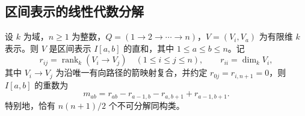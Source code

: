 \subsection{区间表示的线性代数分解}
\label{b5:subsec:0903:03}

\begin{theorem}\label{b5:thm:linear-quiver-intervals}
	设 \(k\) 为域，\(n\ge1\) 为整数，\(Q=(1\to2\to\cdots\to n)\)，\(V=(V_i,V_a)\) 为有限维 \(k\) 表示。则 \(V\) 是区间表示 \(I[a,b]\) 的直和，其中 \(1\le a\le b\le n\)。记
	\[
		r_{ij}=\operatorname{rank}_k(V_i\to V_j)\quad(1\le i\le j\le n), \qquad r_{ii}=\dim_k V_i,
	\]
	其中 \(V_i\to V_j\) 为沿唯一有向路径的箭映射复合，并约定 \(r_{0j}=r_{i,n+1}=0\)，则 \(I[a,b]\) 的重数为
	\[
		m_{ab}=r_{ab}-r_{a-1,b}-r_{a,b+1}+r_{a-1,b+1}.
	\]
	特别地，恰有 \(n(n+1)/2\) 个不可分解同构类。
\end{theorem}
